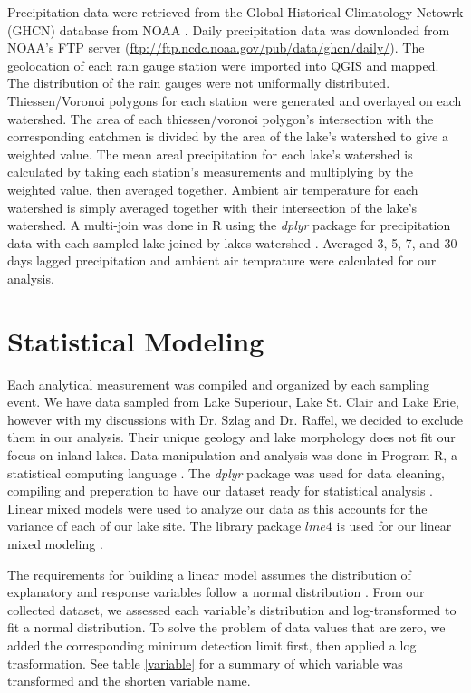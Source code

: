 Precipitation data were retrieved from the Global Historical Climatology Netowrk (GHCN) database from NOAA \cite{}. Daily precipitation data was downloaded from NOAA's FTP server (\url{ftp://ftp.ncdc.noaa.gov/pub/data/ghcn/daily/}).  The geolocation of each rain gauge station were imported into QGIS and mapped. The distribution of the rain gauges were not uniformally distributed. Thiessen/Voronoi polygons for each station were generated and overlayed on each watershed. The area of each thiessen/voronoi polygon's intersection with the corresponding catchmen is divided by the area of the lake's watershed to give a weighted value. The mean areal precipitation for each lake's watershed is calculated by taking each station's measurements and multiplying by the weighted value, then averaged together.  Ambient air temperature for each watershed is simply averaged together with their intersection of the lake's watershed. A multi-join was done in R using the \emph{dplyr} package for precipitation data with each sampled lake joined by lakes watershed \cite{wickham_dplyr:_2017}. Averaged 3, 5, 7, and 30 days lagged precipitation and ambient air temprature were calculated for our analysis.

\section{Statistical Modeling}

Each analytical measurement was compiled and organized by each sampling event. We have data sampled from Lake Superiour, Lake St. Clair and Lake Erie, however with my discussions with Dr. Szlag and Dr. Raffel, we decided to exclude them in our analysis.  Their unique geology and lake morphology does not fit our focus on inland lakes.
Data manipulation and analysis was done in Program R, a statistical computing language \cite{r_core_team_r:_2018}. The \emph{dplyr} package was used for data cleaning, compiling and preperation to have our dataset ready for statistical analysis \cite{wickham_dplyr:_2017}. Linear mixed models were used to analyze our data as this accounts for the variance of each of our lake site. The library package $lme4$ is used for our linear mixed modeling \cite{bates_fitting_2015}.

The requirements for building a linear model assumes the distribution of explanatory and response variables follow a normal distribution \cite{bates_fitting_2015}.
From our collected dataset, we assessed each variable's distribution and log-transformed to fit a normal distribution. To solve the problem of data values that are zero, we added the corresponding mininum detection limit first, then applied a log trasformation. See table \ref{variable} for a summary of which variable was transformed and the shorten variable name.

